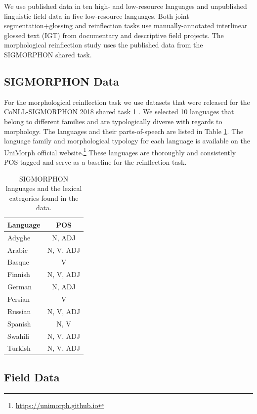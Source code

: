 We use published data in ten high- and low-resource languages and unpublished linguistic field data in five low-resource languages. Both joint segmentation+glossing and reinflection tasks use manually-annotated interlinear glossed text (IGT) from documentary and descriptive field projects. The morphological reinflection study uses the published data from the SIGMORPHON shared task.   


\subsection{SIGMORPHON Data}
\label{sec:sigdata}

For the morphological reinflection task we use datasets that were released for the CoNLL-SIGMORPHON 2018 shared task 1 \citep{cotterell-etal-2018-conll}. We selected 10 languages that belong to different families and are typologically diverse with regards to morphology. The languages and their parts-of-speech are listed in Table \ref{tab:SIGdata}. The language family and morphological typology for each language is available on the UniMorph official website.\footnote{\url{https://unimorph.github.io}} These languages are thoroughly and consistently POS-tagged and serve as a baseline for the reinflection task.  


\begin{table}
    \centering
    \begin{tabular}{lc}
        \textbf{Language} & \textbf{POS} \\
        \hline
        Adyghe  & N, ADJ \\
        Arabic & N, V, ADJ \\
        Basque & V \\
        Finnish & N, V, ADJ \\
        German & N, ADJ \\
        Persian & V \\
        Russian & N, V, ADJ \\
        Spanish & N, V \\
        Swahili & N, V, ADJ \\
        Turkish & N, V, ADJ \\
    \end{tabular}
    \caption{SIGMORPHON languages and the lexical categories found in the data.}
    \label{tab:SIGdata}
\end{table}


\subsection{Field Data}
\label{sec:igtdata}

